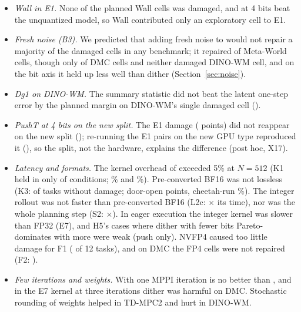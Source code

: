 \begin{itemize}
\item \emph{Wall in E1.} None of the planned Wall cells was damaged, and at 4 bits \dtm beat the unquantized model, so Wall contributed only an exploratory cell to E1.
\item \emph{Fresh noise (B3).} We predicted that adding fresh noise to \dtm would not repair a majority of the damaged cells in any benchmark; it repaired  of  Meta-World cells, though only  of  DMC cells and neither damaged DINO-WM cell, and on the bit axis it held up less well than dither (Section~\ref{sec:noise}).
\item \emph{Dg1 on DINO-WM.} The summary statistic did not beat the latent one-step error by the planned margin on DINO-WM's single damaged cell ().
\item \emph{PushT at 4 bits on the new split.} The E1 damage ( points) did not reappear on the new split (); re-running the E1 pairs on the new GPU type reproduced it (), so the split, not the hardware, explains the difference (post hoc, X17).
\item \emph{Latency and formats.} The kernel overhead of \detshift exceeded 5\% at $N=512$ (K1 held in only  of  conditions; \% and \%). Pre-converted BF16 was not lossless (K3:  of  tasks without damage; door-open  points, cheetah-run \%). The integer rollout was not faster than pre-converted BF16 (L2c: $\times$ its time), nor was the whole planning step (S2: $\times$). In eager execution the integer kernel was slower than FP32 (E7), and H5's cases where dither with fewer bits Pareto-dominates \dtm with more were weak (push only). NVFP4 caused too little damage for F1 ( of 12 tasks), and on DMC the FP4 cells were not repaired (F2: ).
\item \emph{Few iterations and weights.} With one MPPI iteration \shiter is no better than \dtm, and in the E7 kernel at three iterations dither was harmful on DMC. Stochastic rounding of weights helped in TD-MPC2 and hurt in DINO-WM.
\end{itemize}

